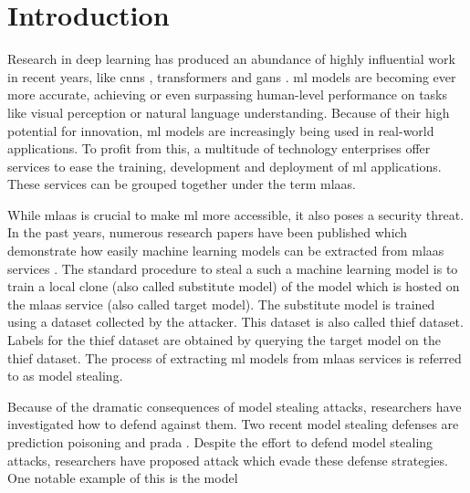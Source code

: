 
\chapter{Introduction}
\label{ch:Introduction}

Research in deep learning has produced an abundance of highly influential work in recent years, like
\glspl{cnn} \cite{lecun1998gradient}, transformers \cite{vaswani2017attention} and \glspl{gan} \cite{goodfellow2020generative}.
\gls{ml} models are becoming ever more accurate, achieving or even surpassing human-level performance on tasks like visual
perception or natural language understanding. Because of their high potential for
innovation, \gls{ml} models are increasingly being used in real-world applications. To profit from this, a multitude of technology
enterprises offer services to ease the training, development and deployment of \gls{ml} applications. These services can
be grouped together under the term \gls{mlaas}. \par
While \gls{mlaas} is crucial to make \gls{ml} more accessible, it also poses a security threat. In the past years, numerous research papers
have been published which demonstrate how easily machine learning models can be extracted from \gls{mlaas} services \parencite{tramer2016stealing,
reith2019efficiently,papernot2017practical}. The standard procedure to steal a such a machine learning model is to train a local
clone (also called substitute model) of the model which is hosted on the \gls{mlaas} service (also called target model). The substitute model is trained
using a dataset collected by the attacker. This dataset is also called thief dataset. Labels for the thief dataset are obtained by querying the target
model on the thief dataset. The process of extracting \gls{ml} models from \gls{mlaas} services is referred to as model stealing. \par
Because of the dramatic consequences of model stealing attacks, researchers have investigated how to defend against them. Two recent model stealing
defenses are prediction poisoning \cite{orekondy2019prediction} and \gls{prada} \cite{juuti2019prada}. Despite the effort to
defend model stealing attacks, researchers have proposed attack which evade these defense strategies. One notable example of this is the model
